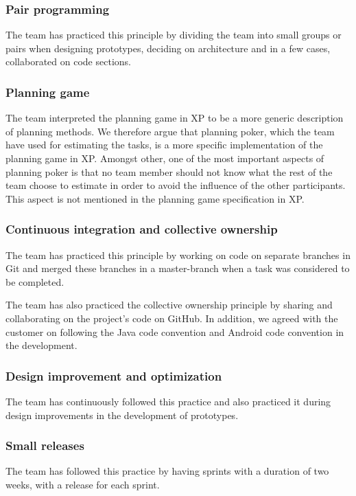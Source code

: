 \subsubsection{Pair programming}
The team has practiced this principle by dividing the team into small groups or pairs when designing prototypes, deciding on architecture and in a few cases, collaborated on code sections.

\subsubsection{Planning game}
The team interpreted the planning game in XP to be a more generic description of planning methods. We therefore argue that planning poker, which the team have used for estimating the tasks, is a more specific implementation of the planning game in XP. Amongst other, one of the most important aspects of planning poker is that no team member should not know what the rest of the team choose to estimate in order to avoid the influence of the other participants. This aspect is not mentioned in the planning game specification in XP.

\subsubsection{Continuous integration and collective ownership}
The team has practiced this principle by working on code on separate branches in Git and merged these branches in a master-branch when a task was considered to be completed.

The team has also practiced the collective ownership principle by sharing and collaborating on the project's code on GitHub. In addition, we agreed with the customer on following the Java code convention and Android code convention in the development.

\subsubsection{Design improvement and optimization}
The team has continuously followed this practice and also practiced it during design improvements in the development of prototypes.
 
\subsubsection{Small releases}
The team has followed this practice by having sprints with a duration of two weeks, with a release for each sprint.


